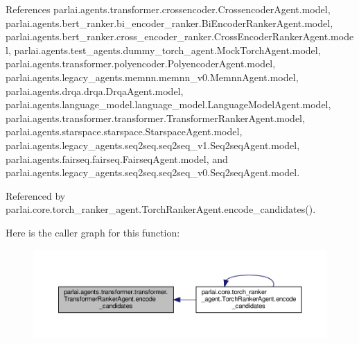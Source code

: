 References parlai.\+agents.\+transformer.\+crossencoder.\+Crossencoder\+Agent.\+model, parlai.\+agents.\+bert\+\_\+ranker.\+bi\+\_\+encoder\+\_\+ranker.\+Bi\+Encoder\+Ranker\+Agent.\+model, parlai.\+agents.\+bert\+\_\+ranker.\+cross\+\_\+encoder\+\_\+ranker.\+Cross\+Encoder\+Ranker\+Agent.\+model, parlai.\+agents.\+test\+\_\+agents.\+dummy\+\_\+torch\+\_\+agent.\+Mock\+Torch\+Agent.\+model, parlai.\+agents.\+transformer.\+polyencoder.\+Polyencoder\+Agent.\+model, parlai.\+agents.\+legacy\+\_\+agents.\+memnn.\+memnn\+\_\+v0.\+Memnn\+Agent.\+model, parlai.\+agents.\+drqa.\+drqa.\+Drqa\+Agent.\+model, parlai.\+agents.\+language\+\_\+model.\+language\+\_\+model.\+Language\+Model\+Agent.\+model, parlai.\+agents.\+transformer.\+transformer.\+Transformer\+Ranker\+Agent.\+model, parlai.\+agents.\+starspace.\+starspace.\+Starspace\+Agent.\+model, parlai.\+agents.\+legacy\+\_\+agents.\+seq2seq.\+seq2seq\+\_\+v1.\+Seq2seq\+Agent.\+model, parlai.\+agents.\+fairseq.\+fairseq.\+Fairseq\+Agent.\+model, and parlai.\+agents.\+legacy\+\_\+agents.\+seq2seq.\+seq2seq\+\_\+v0.\+Seq2seq\+Agent.\+model.



Referenced by parlai.\+core.\+torch\+\_\+ranker\+\_\+agent.\+Torch\+Ranker\+Agent.\+encode\+\_\+candidates().

Here is the caller graph for this function\+:
\nopagebreak
\begin{figure}[H]
\begin{center}
\leavevmode
\includegraphics[width=350pt]{classparlai_1_1agents_1_1transformer_1_1transformer_1_1TransformerRankerAgent_a6067345dff7fefda2809ea3bd63cd8fd_icgraph}
\end{center}
\end{figure}
\mbox{\label{classparlai_1_1agents_1_1transformer_1_1transformer_1_1TransformerRankerAgent_af1af764f534c04a7bc98f11b3fe8f6ca}} 
